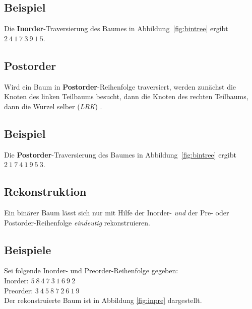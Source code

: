 \subsection*{Beispiel}
Die \textbf{Inorder}-Traversierung des Baumes in Abbildung~\ref{fig:bintree} ergibt $2\ 4\ 1\ 7\ 3\ 9\ 1\ 5$.


\subsection{Postorder}
Wird ein Baum in \textbf{Postorder}-Reihenfolge traversiert, werden zunächst die Knoten des linken Teilbaums besucht, dann die Knoten des rechten Teilbaums, dann die Wurzel selber (\textit{LRK}) .

\subsection*{Beispiel}
Die \textbf{Postorder}-Traversierung des Baumes in Abbildung~\ref{fig:bintree} ergibt $2\ 1\ 7\ 4\ 1\ 9\ 5\ 3$.

\subsection{Rekonstruktion}
Ein binärer Baum lässt sich nur mit Hilfe der Inorder- \textit{und} der Pre- oder Postorder-Reihenfolge \textit{eindeutig} rekonstruieren.

\subsection*{Beispiele}
Sei folgende Inorder- und Preorder-Reihenfolge gegeben:\\

\noindent
Inorder: $5\ 8\ 4\ 7\ 3\ 1\ 6\ 9\ 2$\\
Preorder: $3\ 4\ 5\ 8\ 7\ 2\ 6\ 1\ 9$\\

\noindent
Der rekonstruierte Baum ist in Abbildung \ref{fig:inpre} dargestellt.\\

